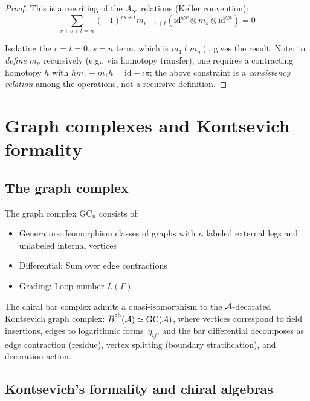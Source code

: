 \begin{proof}
This is a rewriting of the $A_\infty$ relations (Keller convention):
\[\sum_{r+s+t=n} (-1)^{rs+t} m_{r+1+t}(\mathrm{id}^{\otimes r} \otimes m_s \otimes
\mathrm{id}^{\otimes t}) = 0\]

Isolating the $r = t = 0$, $s = n$ term, which is $m_1(m_n)$, gives the result.
Note: to \emph{define} $m_n$ recursively (e.g., via homotopy transfer), one
requires a contracting homotopy $h$ with $h m_1 + m_1 h = \mathrm{id} - \iota\pi$;
the above constraint is a \emph{consistency relation} among the operations,
not a recursive definition.
\end{proof}

\section{Graph complexes and Kontsevich formality}

\subsection{The graph complex}

\begin{definition}
The graph complex $\text{GC}_n$ consists of:
\begin{itemize}
\item Generators: Isomorphism classes of graphs with $n$ labeled external legs 
and unlabeled internal vertices
\item Differential: Sum over edge contractions
\item Grading: Loop number $L(\Gamma)$
\end{itemize}
\end{definition}

\begin{conjecture}
\label{conj:bar-graph-complex}
The chiral bar complex admits a quasi-isomorphism to the
$\mathcal{A}$-decorated Kontsevich graph complex:
$\overline{B}^{\mathrm{ch}}(\mathcal{A}) \simeq \mathrm{GC}(\mathcal{A})$,
where vertices correspond to field insertions, edges to logarithmic
forms~$\eta_{ij}$, and the bar differential decomposes as edge
contraction (residue), vertex splitting (boundary stratification),
and decoration action.
\end{conjecture}

\subsection{Kontsevich's formality and chiral algebras}

